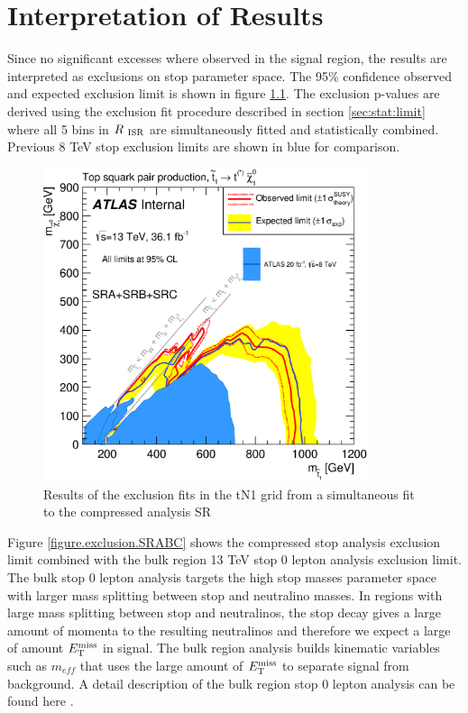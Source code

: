 \chapter{Interpretation of Results}
\label{chap:Interpretation}

\indent Since no significant excesses where observed in the signal region, the results are interpreted as exclusions on stop parameter space.  The 95\% confidence observed and expected exclusion limit is shown in figure \ref{figure.exclusion.SRC}.  The exclusion p-values are derived using the exclusion fit procedure described in section \ref{sec:stat:limit} where all 5 bins in $R_{~\mathrm{ISR}}$ are simultaneously fitted and statistically combined. \\

\indent Previous 8 TeV stop exclusion limits are shown in blue for comparison. \\

\begin{figure}[htbp]
	\begin{center}
		\includegraphics[width=0.85\textwidth]{figures/fit/atlascls_m0m12_wband1_showcms0_StopZL2016_SRABC_Tt_directTTplusbWN_all_Output_fixSigXSecNominal_hypotest__1_harvest_list.eps}
		\caption{Results of the exclusion fits in the tN1 grid from a simultaneous fit to the compressed analysis SR}
		\label{figure.exclusion.SRC}
	\end{center}
\end{figure}

\indent Figure \ref{figure.exclusion.SRABC} shows the compressed stop analysis exclusion limit combined with the bulk region 13 TeV stop 0 lepton analysis exclusion limit.  The bulk stop 0 lepton analysis targets the high stop masses parameter space with larger mass splitting between stop and neutralino masses.  In regions with large mass splitting between stop and neutralinos, the stop decay gives a large amount of momenta to the resulting neutralinos and therefore we expect a large of amount $E_{\mathrm{T}}^{\mathrm{miss}}$ in signal.  The bulk region analysis builds kinematic variables such as $m_{eff}$ that uses the large amount of $E_{\mathrm{T}}^{\mathrm{miss}}$ to separate signal from background.  A detail description of the bulk region stop 0 lepton analysis can be found here \cite{stop0Lmoriond}.  \\

